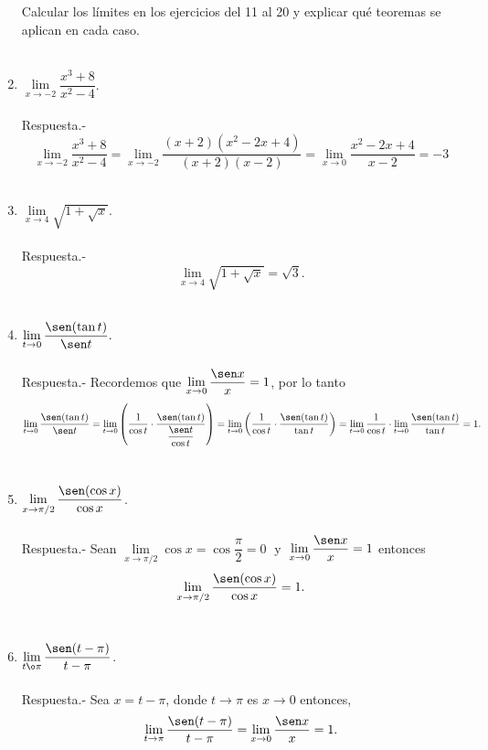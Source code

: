 \begin{enumerate}[\bfseries 1.]
Calcular los límites en los ejercicios del 11 al 20 y explicar qué teoremas se aplican en cada caso.\\\\

    \item $\lim\limits_{x\to -2} \dfrac{x^3+8}{x^2-4}$.\\\\
	Respuesta.-\; $$\lim\limits_{x\to -2} \dfrac{x^3+8}{x^2-4} = \lim_{x\to -2}\dfrac{(x+2)(x^2-2x+4)}{(x+2)(x-2)} = \lim_{x\to 0}\dfrac{x^2-2x+4}{x-2} = -3$$\\

    \item $\lim\limits_{x\to 4}\sqrt{1+\sqrt{x}}.$\\\\
	Respuesta.-\; $$\lim\limits_{x\to 4}\sqrt{1+\sqrt{x}} = \sqrt{3}.$$\\

    \item $\lim\limits_{t\to 0}\dfrac{\sen(\tan t)}{\sen t}.$\\\\
	Respuesta.-\; Recordemos que $\lim\limits_{x\to 0}\dfrac{\sen x}{x}=1$, por lo tanto
	$$\lim_{t\to 0}\dfrac{\sen(\tan t)}{\sen t}=\lim_{t\to 0} \left(\dfrac{1}{\cos t}\cdot \dfrac{\sen(\tan t)}{\dfrac{\sen t}{\cos t}}\right) = \lim_{t\to 0}\left(\dfrac{1}{\cos t}\cdot \dfrac{\sen(\tan t)}{\tan t}\right) = \lim_{t\to 0}\dfrac{1}{\cos t}\cdot \lim_{t\to 0}\dfrac{\sen (\tan t)}{\tan t} = 1.$$\\

    \item $\lim\limits_{x\to \pi/2} \dfrac{\sen(\cos x)}{\cos x}$.\\\\
	Respuesta.-\; Sean $\lim\limits_{x\to \pi/2} \cos x = \cos \dfrac{\pi}{2} = 0\; $ y $\; \lim\limits_{x\to 0}\dfrac{\sen x }{x} = 1$ entonces
	$$\lim_{x\to \pi/2}\dfrac{\sen(\cos x)}{\cos x}=1.$$\\


    \item $\lim\limits_{t\o \pi}\dfrac{\sen(t-\pi)}{t-\pi}$.\\\\
	Respuesta.-\; Sea $x=t-\pi$, donde $t\to \pi$ es $x \to 0$ entonces,
	$$\lim\limits_{t\to \pi}\dfrac{\sen(t-\pi)}{t-\pi} = \lim\limits_{x\to 0}\dfrac{\sen x}{x}=1.$$\\


\end{enumerate}

